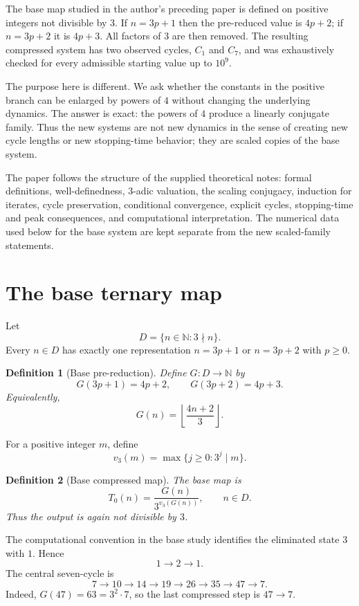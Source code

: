\documentclass[11pt]{article}
\newtheorem{definition}{Definition}[section]
\begin{document}
The base map studied in the author's preceding paper is defined on positive integers not divisible by $3$. If $n=3p+1$ then the pre-reduced value is $4p+2$; if $n=3p+2$ it is $4p+3$. All factors of $3$ are then removed. The resulting compressed system has two observed cycles, $C_1$ and $C_7$, and was exhaustively checked for every admissible starting value up to $10^9$.

The purpose here is different. We ask whether the constants in the positive branch can be enlarged by powers of $4$ without changing the underlying dynamics. The answer is exact: the powers of $4$ produce a linearly conjugate family. Thus the new systems are not new dynamics in the sense of creating new cycle lengths or new stopping-time behavior; they are scaled copies of the base system.

The paper follows the structure of the supplied theoretical notes: formal definitions, well-definedness, $3$-adic valuation, the scaling conjugacy, induction for iterates, cycle preservation, conditional convergence, explicit cycles, stopping-time and peak consequences, and computational interpretation. The numerical data used below for the base system are kept separate from the new scaled-family statements.

\section{The base ternary map}
Let
\[
D=\{n\in\mathbb N:3\nmid n\}.
\]
Every $n\in D$ has exactly one representation $n=3p+1$ or $n=3p+2$ with $p\ge0$.

\begin{definition}[Base pre-reduction]
Define $G:D\to\mathbb N$ by
\[
G(3p+1)=4p+2,\qquad G(3p+2)=4p+3.
\]
Equivalently,
\[
G(n)=\left\lfloor\frac{4n+2}{3}\right\rfloor.
\]
\end{definition}

For a positive integer $m$, define
\[
v_3(m)=\max\{j\ge0:3^j\mid m\}.
\]

\begin{definition}[Base compressed map]
The base map is
\[
T_0(n)=\frac{G(n)}{3^{v_3(G(n))}},\qquad n\in D.
\]
Thus the output is again not divisible by $3$.
\end{definition}

The computational convention in the base study identifies the eliminated state $3$ with $1$. Hence
\[
1\longrightarrow2\longrightarrow1.
\]
The central seven-cycle is
\[
7\to10\to14\to19\to26\to35\to47\to7.
\]
Indeed, $G(47)=63=3^2\cdot7$, so the last compressed step is $47\to7$.
\end{document}

